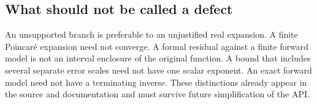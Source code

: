 \subsection{What should not be called a defect}
An unsupported branch is preferable to an unjustified real expansion. A finite Poincar\'e expansion need not converge. A formal residual against a finite forward model is not an interval enclosure of the original function. A bound that includes several separate error scales need not have one scalar exponent. An exact forward model need not have a terminating inverse. These distinctions already appear in the source and documentation and must survive future simplification of the API.\cite{guide,core,certificates,native,dlmf-asymptotic}
